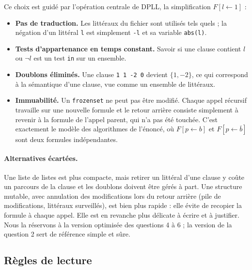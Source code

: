 \documentclass[11pt,a4paper]{article}
\begin{document}
Ce choix est guidé par l'opération centrale de DPLL, la simplification
$F[l\leftarrow 1]$ :
\begin{itemize}
  \item \textbf{Pas de traduction.} Les littéraux du fichier sont utilisés
    tels quels ; la négation d'un littéral \texttt{l} est simplement
    \texttt{-l} et sa variable \texttt{abs(l)}.
  \item \textbf{Tests d'appartenance en temps constant.} Savoir si une clause
    contient $l$ ou $\neg l$ est un test \texttt{in} sur un ensemble.
  \item \textbf{Doublons éliminés.} Une clause \texttt{1 1 -2 0} devient
    $\{1,-2\}$, ce qui correspond à la sémantique d'une clause, vue comme
    un ensemble de littéraux.
  \item \textbf{Immuabilité.} Un \texttt{frozenset} ne peut pas être modifié.
    Chaque appel récursif travaille sur une nouvelle formule et le retour
    arrière consiste simplement à revenir à la formule de l'appel parent,
    qui n'a pas été touchée. C'est exactement le modèle des algorithmes de
    l'énoncé, où $F[p\leftarrow b]$ et $F[p\leftarrow\overline{b}]$ sont
    deux formules indépendantes.
\end{itemize}

\paragraph{Alternatives écartées.} Une liste de listes est plus compacte,
mais retirer un littéral d'une clause y coûte un parcours de la clause et les
doublons doivent être gérés à part. Une structure mutable, avec annulation des
modifications lors du retour arrière (pile de modifications, littéraux
surveillés), est bien plus rapide : elle évite de recopier la formule à chaque
appel. Elle est en revanche plus délicate à écrire et à justifier. Nous la
réservons à la version optimisée des questions 4 à 6 ; la version de la
question 2 sert de référence simple et sûre.

\subsection{Règles de lecture}
\end{document}
